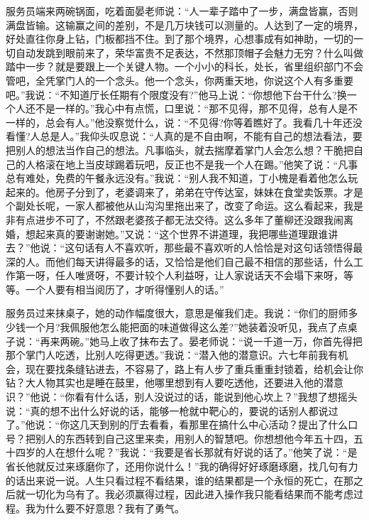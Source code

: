 \documentclass[12pt,oneside]{book}
\begin{document}
服务员端来两碗锅面，吃着面晏老师说：``人一辈子踏中了一步，满盘皆赢，否则满盘皆输。这输赢之间的差别，不是几万块钱可以测量的。人达到了一定的境界，好处直往你身上钻，门板都挡不住。到了那个境界，心想事成有如神助，一切的一切自动发跳到眼前来了，荣华富贵不足表达，不然那顶帽子会魅力无穷？什么叫做踏中一步？就是要跟上一个关键人物。一个小小的科长，处长，省里组织部门不会管吧，全凭掌门人的一个念头。他一个念头，你两重天地，你说这个人有多重要吧。''我说：``不知道厅长任期有个限度没有?''他马上说：``你想他下台干什么?换一个人还不是一样的。''我心中有点慌，口里说：``那不见得，那不见得，总有人是不一样的，总会有人。''他没察觉什么，说：``不见得?你等着瞧好了。我看几十年还没看懂?人总是人。''我仰头叹息说：``人真的是不自由啊，不能有自己的想法看法，要把别人的想法当作自己的想法。凡事临头，就去揣摩着掌门人会怎么想？干脆把自己的人格滚在地上当皮球踢着玩吧，反正也不是我一个人在踢。''他笑了说：``凡事总有难处，免费的午餐永远没有。''我说：``别人我不知道，丁小槐是看着他怎么玩起来的。他房子分到了，老婆调来了，弟弟在守传达室，妹妹在食堂卖饭票。才是个副处长呢，一家人都被他从山沟沟里拖出来了，改变了命运。这么看起来，我是非有点进步不可了，不然跟老婆孩子都无法交待。这么多年了董柳还没跟我闹离婚，想起来真的要谢谢她。''又说：``这个世界不讲道理，我把哪些道理跟谁讲去？''他说：``这句话有人不喜欢听，那些最不喜欢听的人恰恰是对这句话领悟得最深的人。而他们每天讲得最多的话，又恰恰是他们自己最不相信的那些话，什么工作第一呀，任人唯贤呀，不要计较个人利益呀，让人家说话天不会塌下来呀，等等。一个人要有相当阅历了，才听得懂别人的话。''

服务员过来抹桌子，她的动作幅度很大，意思是催我们走。我说：``你们的厨师多少钱一个月?我佩服他怎么能把面的味道做得这么差?''她装着没听见，我点了点桌子说：``再来两碗。''她马上收了抹布去了。晏老师说：``说一千道一万，你首先得把那个掌门人吃透，比别人吃得更透。''我说：``潜入他的潜意识。六七年前我有机会，现在要找条缝钻进去，不容易了，路上有人步了重兵重重封锁着，给机会让你钻？大人物其实也是睡在鼓里，他哪里想到有人要吃透他，还要进入他的潜意识？''他说：``你看有什么话，别人没说过的话，能说到他心坎上？''我想了想摇头说：``真的想不出什么好说的话，能够一枪就中靶心的，要说的话别人都说过了。''他说：``你这几天到别的厅去看看，看那里在搞什么中心活动？提出了什么口号？把别人的东西转到自己这里来卖，用别人的智慧吧。你想想他今年五十四，五十四岁的人在想什么呢？''我说：``我要是省长那就有好说的话了。''他笑了说：``是省长他就反过来琢磨你了，还用你说什么！''我的确得好好琢磨琢磨，找几句有力的话出来说一说。人生只看过程不看结果，谁的结果都是一个永恒的死亡，在那之后就一切化为乌有了。我必须赢得过程，因此进入操作我只能看结果而不能考虑过程。我为什么要不好意思？我有了勇气。
\end{document}
